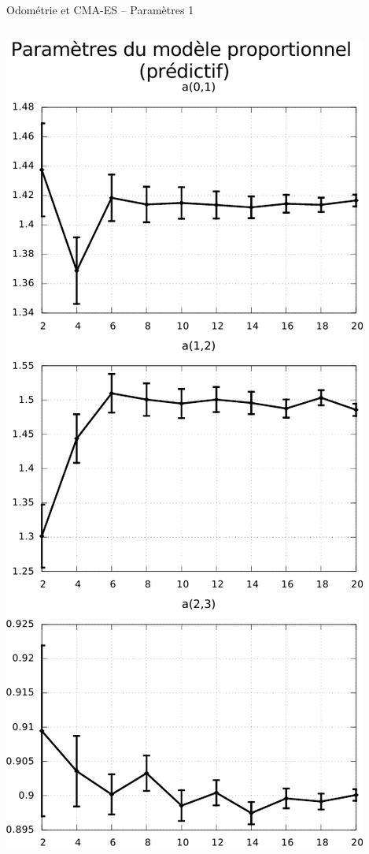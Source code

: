 \begin{frame}[noframenumbering]{Odométrie et CMA-ES -- Paramètres 1}
    \begin{columns}
        \begin{column}{0.5\linewidth}
            \centering
            \includegraphics[type=pdf,ext=.pdf,read=.pdf,width=0.6\linewidth]{../plot/OdometryCMAES/parametersPropOrders}
        \end{column}
        \begin{column}{0.5\linewidth}
            \centering

\end{column}
\end{columns}
\end{frame}
